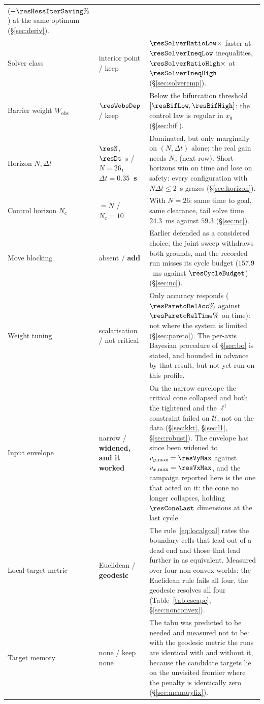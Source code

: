 \documentclass[11pt,a4paper]{article}
\newcommand{\Wobs}{W_{\mathrm{obs}}}
\newcommand{\Ninput}{N_c}
\begin{document}
\begin{table}[htbp]
\begin{tabular}{p{}p{}p{}}
      ($-\resHessIterSaving\%$) at the same optimum (\S\ref{sec:deriv}). \\
    Solver class & interior point / keep & $\resSolverRatioLow\times$ faster at $\resSolverIneqLow$
      inequalities, $\resSolverRatioHigh\times$ at $\resSolverIneqHigh$ (\S\ref{sec:solvercmp}). \\
    Barrier weight $\Wobs$ & $\resWobsDep$ / keep & Below the bifurcation threshold
      $[\resBifLow,\resBifHigh]$: the control law is regular in $x_0$ (\S\ref{sec:bif}). \\
    Horizon $N,\Delta t$ & $\resN$, $\resDt$~s / \textbf{$N=26$, $\Delta t=0.35$~s} & Dominated, but only
      marginally on $(N,\Delta t)$ alone; the real gain needs $\Ninput$ (next row). Short horizons win on
      time and lose on safety: every configuration with $N\Delta t\le2$~s grazes (\S\ref{sec:horizon}). \\
    Control horizon $\Ninput$ & $=N$ / \textbf{$\Ninput=10$} & With $N=26$: same time to goal, same
      clearance, tail solve time $24.3$~ms against $59.3$ (\S\ref{sec:nc}). \\
    Move blocking & absent / \textbf{add} & Earlier defended as a considered choice; the joint sweep
      withdraws both grounds, and the recorded run misses its cycle budget ($157.9$~ms against
      $\resCycleBudget$) (\S\ref{sec:nc}). \\
    Weight tuning & scalarisation / not critical & Only accuracy responds ($\resParetoRelAcc\%$ against
      $\resParetoRelTime\%$ on time): not where the system is limited (\S\ref{sec:pareto}). The per-axis
      Bayesian procedure of \S\ref{sec:bo} is stated, and bounded in advance by that result, but not yet
      run on this profile. \\
    Input envelope & narrow / \textbf{widened, and it worked} & On the narrow envelope the critical cone
      collapsed and both the tightened and the $\ell^1$ constraint failed on $\mathcal{U}$, not on the data
      (\S\ref{sec:kkt}, \S\ref{sec:l1}, \S\ref{sec:robust}). The envelope has since been widened to
      $v_{y,\max}=\resVyMax$ against $v_{x,\max}=\resVxMax$, and the campaign reported here is the one that
      acted on it: the cone no longer collapses, holding $\resConeLast$ dimensions at the last cycle. \\
    Local-target metric & Euclidean / \textbf{geodesic} & The rule~\eqref{eq:localgoal} rates the boundary
      cells that lead out of a dead end and those that lead further in as equivalent. Measured over four
      non-convex worlds: the Euclidean rule fails all four, the geodesic resolves all four
      (Table~\ref{tab:escape}, \S\ref{sec:nonconvex}). \\
    Target memory & none / keep none & The tabu was predicted to be needed and measured not to be: with the
      geodesic metric the runs are identical with and without it, because the candidate targets lie on the
      unvisited frontier where the penalty is identically zero (\S\ref{sec:memoryfix}). \\
    \bottomrule
  \end{tabular}
\end{table}
\end{document}
